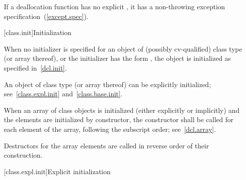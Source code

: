 \pnum
\begin{note}
If a deallocation function has no explicit , it
has a non-throwing exception specification~(\ref{except.spec}).
\end{note}

[class.init]{Initialization}%
%
%

\pnum
When no initializer is specified for an object of (possibly
cv-qualified) class type (or array thereof), or the initializer has
the form
\tcode{()},
the object is initialized as specified in~\ref{dcl.init}.

\pnum
An object of class type (or array thereof) can be explicitly initialized;
see~\ref{class.expl.init} and~\ref{class.base.init}.

\pnum
{}%
When an array of class objects is initialized
(either explicitly or implicitly) and the elements are initialized by constructor,
the constructor shall be called for each element of the array,
following the subscript order; see~\ref{dcl.array}.
\begin{note}
Destructors for the array elements are called in reverse order of their
construction.
\end{note}

[class.expl.init]{Explicit initialization}%
%
%

